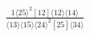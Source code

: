 \documentclass[varwidth, border=5pt]{standalone}
\begin{document}
\begin{my}
$\begin{gathered}
\scriptscriptstyle\frac{1⟨25⟩^2[12]⟨12⟩⟨14⟩}{⟨13⟩⟨15⟩⟨24⟩^2[25]⟨34⟩}
\end{gathered}$
\end{my}
\end{document}
